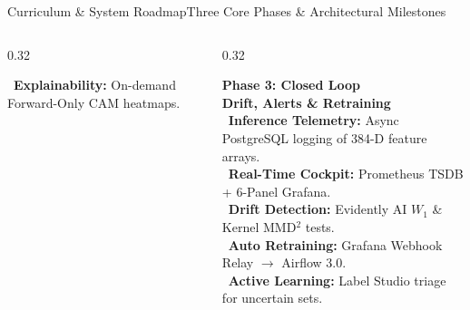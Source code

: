 \documentclass[aspectratio=169,10pt]{beamer}
\begin{document}
\begin{frame}{Curriculum \& System Roadmap}{Three Core Phases \& Architectural Milestones}
\begin{columns}[T]
\begin{column}{0.32\textwidth}
\begin{greencard}
                \textbullet\ \textbf{Explainability:} On-demand Forward-Only CAM heatmaps.
            \end{greencard}
        \end{column}
        \begin{column}{0.32\textwidth}
            \begin{purplecard}
                \centering
                \textbf{\color{PurpleAccent} Phase 3: Closed Loop}\\[2pt]
                \textbf{\scriptsize Drift, Alerts \& Retraining}\\[4pt]
                \RaggedRight\scriptsize
                \textbullet\ \textbf{Inference Telemetry:} Async PostgreSQL logging of 384-D feature arrays.\\[3pt]
                \textbullet\ \textbf{Real-Time Cockpit:} Prometheus TSDB + 6-Panel Grafana.\\[3pt]
                \textbullet\ \textbf{Drift Detection:} Evidently AI $W_1$ \& Kernel MMD$^2$ tests.\\[3pt]
                \textbullet\ \textbf{Auto Retraining:} Grafana Webhook Relay $\to$ Airflow 3.0.\\[3pt]
                \textbullet\ \textbf{Active Learning:} Label Studio triage for uncertain sets.
            \end{purplecard}
        \end{column}
    \end{columns}
\end{frame}
\end{document}
